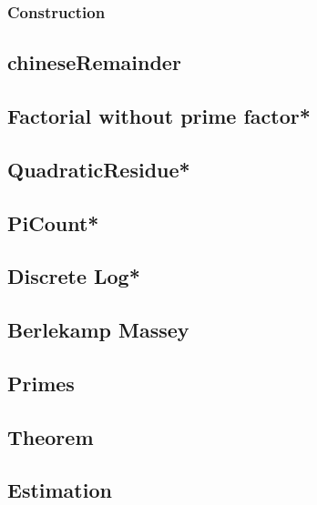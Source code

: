 \subsubsection{Construction}

%
\subsection{chineseRemainder}

\subsection{Factorial without prime factor*} %

\subsection{QuadraticResidue*} %

\subsection{PiCount*} %

\subsection{Discrete Log*} %

\subsection{Berlekamp Massey}

\subsection{Primes}

\subsection{Theorem}

\subsection{Estimation}

